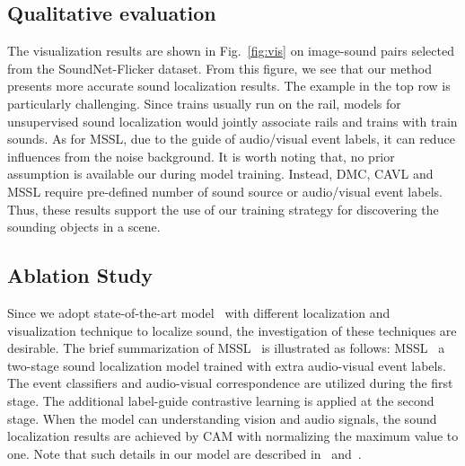 

\subsection{Qualitative evaluation}
The visualization results are shown in Fig.~\ref{fig:vis} on image-sound pairs selected from the SoundNet-Flicker dataset. 
% 
From this figure, we see that our method presents more accurate sound localization results.
% 
The example in the top row is particularly challenging. Since trains usually run on the rail, models for unsupervised sound localization would jointly associate rails and trains with train sounds. 
% 
As for MSSL, due to the guide of audio/visual event labels, it can reduce influences from the noise background.
% 
It is worth noting that, no prior assumption is available our during model training. Instead, DMC, CAVL and MSSL require pre-defined number of sound source or audio/visual event labels. 
% 
Thus, these results support the use of our training strategy for discovering the sounding objects in a scene.




\subsection{Ablation Study}
Since we adopt state-of-the-art model~\cite{av_eccv20_mms_loc} with different localization and visualization technique to localize sound,
the investigation of these techniques are desirable.
% 
The brief summarization of MSSL~\cite{av_eccv20_mms_loc} is illustrated as follows:
% 
MSSL~\cite{av_eccv20_mms_loc} a two-stage sound localization model trained with extra audio-visual event labels.
% 
The event classifiers and audio-visual correspondence are utilized during the first stage.
% 
The additional label-guide contrastive learning is applied at the second stage.
% 
When the model can understanding vision and audio signals,
the sound localization results are achieved by CAM with normalizing the maximum value to one. 
% 
Note that such details in our model are described in~ and~.

